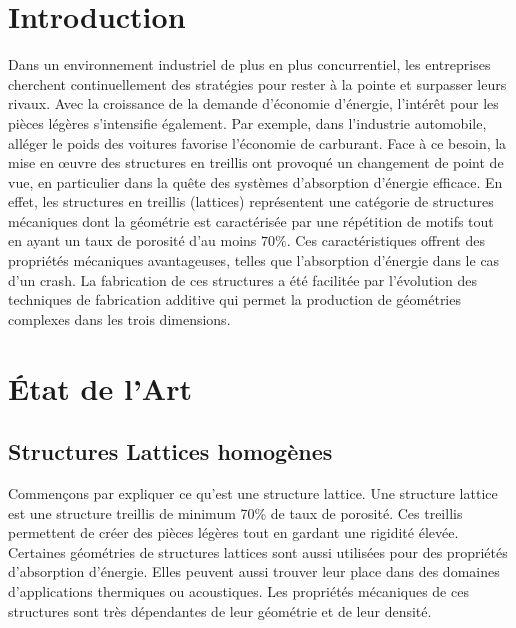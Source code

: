 \documentclass[a4paper]{article}
\begin{document}
	\newpage
	\renewcommand{\listfigurename}{Table des illustrations}
	\listoffigures
	\captionsetup{justification=centering}
	\newpage
	\renewcommand{\listtablename}{Liste des tableaux}
	\listoftables
	\captionsetup{justification=centering}
	\newpage
	
	\section{Introduction}
	\hspace{0.5cm}Dans un environnement industriel de plus en plus concurrentiel, les entreprises cherchent continuellement des stratégies pour rester à la pointe et surpasser leurs rivaux. Avec la croissance de la demande d’économie d’énergie, l'intérêt pour les pièces légères s'intensifie également. Par exemple, dans l'industrie automobile, alléger le poids des voitures favorise l'économie de carburant. Face à ce besoin, la mise en \oe uvre des structures en treillis ont provoqué un changement de point de vue, en particulier dans la quête des systèmes d'absorption d’énergie efficace. En effet, les structures en treillis (lattices) représentent une catégorie de structures mécaniques dont la géométrie est caractérisée par une répétition de motifs tout en ayant un taux de porosité d'au moins $70\%$. Ces caractéristiques offrent des propriétés mécaniques avantageuses, telles que l’absorption d’énergie dans le cas d’un crash. La fabrication de ces structures a été facilitée par l’évolution des techniques de fabrication additive qui permet la production de géométries complexes dans les trois dimensions.
	\newpage
	
	\section{État de l'Art}
	\subsection{Structures Lattices homogènes}
	\hspace{0.5cm}Commençons par expliquer ce qu’est une structure lattice. Une structure lattice est une structure treillis de minimum 70\% de taux de porosité. Ces treillis permettent de créer des pièces légères tout en gardant une rigidité élevée. Certaines géométries de structures lattices sont aussi utilisées pour des propriétés d’absorption d’énergie. Elles peuvent aussi trouver leur place dans des domaines d’applications thermiques ou acoustiques. Les propriétés mécaniques de ces structures sont très dépendantes de leur géométrie et de leur densité.\\
	
\end{document}
